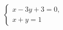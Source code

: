\begin{ex}
	\begin{condition}
		\( \left\{
		\begin{array}{l}
			x-3y+3=0,\\
			x+y=1
		\end{array}
		\right. \)
	\end{condition}
\end{ex}